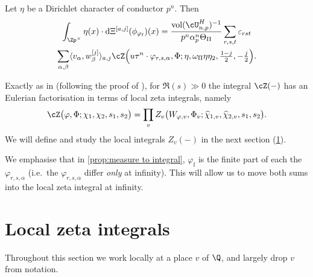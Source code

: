\documentclass[10pt,reqno,a4paper]{amsart}
\newcommand{\chihat}{\widehat{\chi}}
\newcommand{\subf}{_{\mathrm{f}}}
\begin{document}
\begin{proposition}\label{prop:measure to integral}
Let $\eta$ be a Dirichlet character of conductor $p^n$. Then
\begin{multline*}
	\int_{\Zp^\times} \eta(x)  \cdot \mathrm{d}\Xi^{[a,j]}(\phi_{\varphi\subf})(x) =  \frac{\operatorname{vol}(\cU_{n,p}^H)^{-1}}{p^{n}\alpha_{p}^n \Theta_\Pi} \sum_{r,s,t} \varepsilon_{rst}\\
	\sum_{\alpha,\beta} \langle v_\alpha, w_\beta^{[j]}\rangle_{a,j} \cZ\Big(u\tau^n\cdot \varphi_{r,s,\alpha}, \Phi; \eta, \omega_\Pi\eta\eta_2, \tfrac{1-j}{2},-\tfrac{j}{2}\Big).
\end{multline*}
\end{proposition}


Exactly as in \cite[Prop.\ 3.1]{Mah98} (following the proof of \cite[Prop.\ 3.3]{JS_EulerProducts_II}), for $\Re(s) \gg 0$ the integral $\cZ(-)$ has an Eulerian factorisation in terms of local zeta integrals, namely
\begin{equation}\label{eq:global to local}
\cZ\big(\varphi, \Phi; \chi_1,\chi_2,s_1,s_2\big) = \prod_v Z_v\big(W_{\varphi,v}, \Phi_v; \chihat_{1,v},\chihat_{2,v},s_1,s_2\big).
\end{equation}
We will define and study the local integrals $Z_v(-)$ in the next section (\cref{sec:local zeta integrals}).

We emphasise that in \cref{prop:measure to integral}, $\varphi\subf$ is the finite part of each the $\varphi_{r,s,\alpha}$ (i.e.\ the $\varphi_{r,s,\alpha}$ differ \emph{only} at infinity). This will allow us to move both sums into the local zeta integral at infinity.





\section{Local zeta integrals}\label{sec:local zeta integrals}

Throughout this section we work locally at a place $v$ of $\Q$, and largely drop $v$ from notation.
\end{document}
